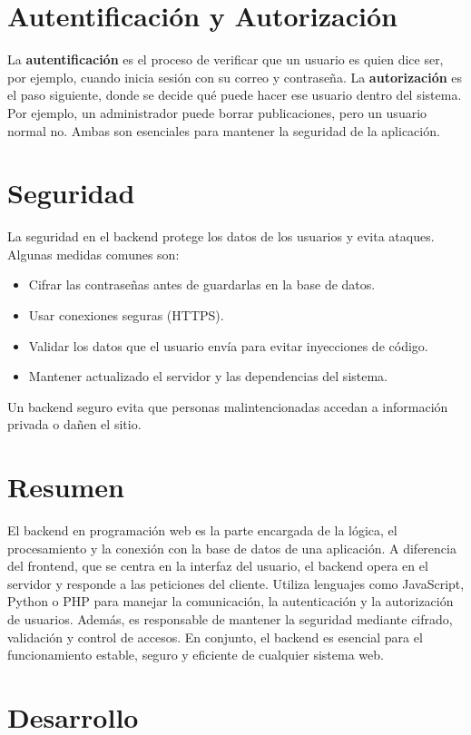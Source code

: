 \documentclass[11pt]{scrartcl}
\begin{document}
\section*{Autentificación y Autorización}
La \textbf{autentificación} es el proceso de verificar que un usuario es quien dice ser, por ejemplo, cuando inicia sesión con su correo y contraseña.  
La \textbf{autorización} es el paso siguiente, donde se decide qué puede hacer ese usuario dentro del sistema. Por ejemplo, un administrador puede borrar publicaciones, pero un usuario normal no.  
Ambas son esenciales para mantener la seguridad de la aplicación.

\section*{Seguridad}
La seguridad en el backend protege los datos de los usuarios y evita ataques. Algunas medidas comunes son:
\begin{itemize}
    \item Cifrar las contraseñas antes de guardarlas en la base de datos.
    \item Usar conexiones seguras (HTTPS).
    \item Validar los datos que el usuario envía para evitar inyecciones de código.
    \item Mantener actualizado el servidor y las dependencias del sistema.
\end{itemize}
Un backend seguro evita que personas malintencionadas accedan a información privada o dañen el sitio.


\section{Resumen}
El backend en programación web es la parte encargada de la lógica, el procesamiento y la conexión con la base de datos de una aplicación. A diferencia del frontend, que se centra en la interfaz del usuario, el backend opera en el servidor y responde a las peticiones del cliente. Utiliza lenguajes como JavaScript, Python o PHP para manejar la comunicación, la autenticación y la autorización de usuarios. Además, es responsable de mantener la seguridad mediante cifrado, validación y control de accesos. En conjunto, el backend es esencial para el funcionamiento estable, seguro y eficiente de cualquier sistema web.

\section{Desarrollo}
\end{document}
